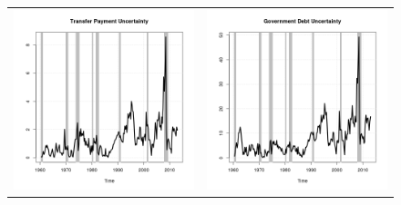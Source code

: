 \documentclass[11pt]{article}
\begin{document}
\begin{figure}
\begin{center}
\begin{tabular}{cc}
\includegraphics[scale=0.45]{./results/pics0.04/fpu_transfers.png} & \includegraphics[scale=0.45]{./results/pics0.04/fpu_debt.png}  
\end{tabular}
\end{center}
\end{figure} 
\end{document}
